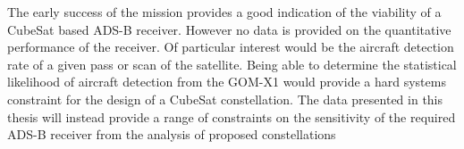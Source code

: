 The early success of the mission provides a good indication of the viability of a CubeSat based ADS-B receiver. However no data is provided on the quantitative performance of the receiver. Of particular interest would be the aircraft detection rate of a given pass or scan of the satellite. Being able to determine the statistical likelihood of aircraft detection from the GOM-X1 would provide a hard systems constraint for the design of a CubeSat constellation. The data presented in this thesis will instead provide a range of constraints on the sensitivity of the required ADS-B receiver from the analysis of proposed constellations  

